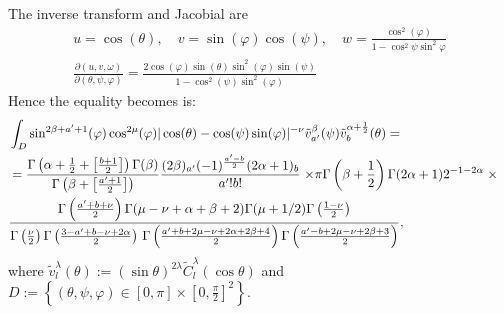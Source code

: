 \documentclass{article}
\newcommand{\assign}{:=}
\begin{document}
\begin{answer}
  The inverse transform and Jacobial are
  \begin{eqnarray}
    & u = \cos (\theta), \quad v = \sin (\varphi) \cos (\psi), \quad w =
    \frac{\cos^2 (\varphi)}{1 - \cos^2 \psi \sin^2 \varphi} &  \nonumber\\
    & \frac{\partial (u, v, \omega)}{\partial (\theta, \psi, \varphi)} =
    \frac{2 \cos (\varphi) \sin (\theta) \sin^2 (\varphi) \sin (\psi)}{1 -
    \cos^2 (\psi) \sin^2 (\varphi)} &  \nonumber
  \end{eqnarray}
  Hence the equality becomes is:
  \begin{eqnarray}
    & \int_D \sin^{2 \beta + a' + 1} (\varphi) \cos^{2 \mu} (\varphi) | \cos
    (\theta) - \cos (\psi) \sin (\varphi) |^{- \nu} \tilde{v}^{\beta}_{a'}
    (\psi) \tilde{v}^{\alpha + \frac{1}{2}}_b (\theta) = &  \nonumber\\
    & = \frac{\Gamma \left( \alpha + \frac{1}{2} + \left[ \frac{b + 1}{2}
    \right] \right) \Gamma (\beta)}{\Gamma \left( \beta + \left[ \frac{a' +
    1}{2} \right] \right)} \frac{(2 \beta)_{a'} (- 1)^{\frac{a' - b}{2}} (2
    \alpha + 1)_b}{a' ! b!} \left. \times \pi \Gamma \left( \beta +
    \frac{1}{2} \right) \Gamma (2 \alpha + 1) 2^{- 1 - 2 \alpha} \right.
    \times &  \nonumber\\
    & \frac{\Gamma \left( \frac{a' + b + \nu}{2} \right) \Gamma (\mu - \nu +
    \alpha + \beta + 2) \Gamma (\mu + 1 / 2) \Gamma \left( \frac{1 - \nu}{2}
    \right)}{\Gamma \left( \frac{\nu}{2} \right) \Gamma \left( \frac{3 - a' +
    b - \nu + 2 \alpha}{2} \right)  \hspace{0.17em} \Gamma \left( \frac{a' + b
    + 2 \mu - \nu + 2 \alpha + 2 \beta + 4}{2} \right) \Gamma \left( \frac{a'
    - b + 2 \mu - \nu + 2 \beta + 3}{2} \right)}, &  \nonumber
  \end{eqnarray}
  where $\tilde{v}_l^{\lambda} (\theta) \assign (\sin \theta)^{2 \lambda}
  \tilde{C}^{\lambda}_l (\cos \theta)$ and $D \assign \left\{ (\theta, \psi,
  \varphi) \in [0, \pi] \times \left[ 0, \frac{\pi}{2} \right]^2 \right\}$.
  

\end{answer}
\end{document}
